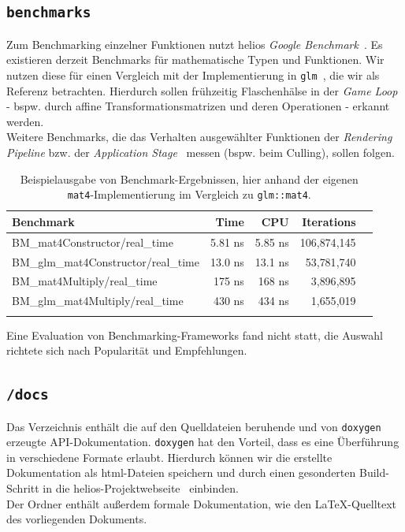 \subsection*{\texttt{benchmarks}}
\noindent
Zum Benchmarking einzelner Funktionen nutzt helios \textit{Google Benchmark}~\cite[]{googlebenchmarkgithub}.
Es existieren derzeit Benchmarks für mathematische Typen und Funktionen.
Wir nutzen diese für einen Vergleich mit der Implementierung in \texttt{glm}~\cite[]{glmGithub}, die wir als Referenz betrachten.
Hierdurch sollen frühzeitig Flaschenhälse in der \textit{Game Loop} - bspw.  durch affine Transformationsmatrizen und deren Operationen - erkannt werden.\\
Weitere Benchmarks, die das Verhalten ausgewählter Funktionen der \textit{Rendering Pipeline} bzw. der \textit{Application Stage}~\cite[687]{Gre19} messen (bspw. beim Culling), sollen folgen.
\begin{table}[h!]
    \centering
    \begin{tabular}{lrrrr}
        \hline
        \textbf{Benchmark} & \textbf{Time} & \textbf{CPU} & \textbf{Iterations} \\
        \hline
        BM\_mat4Constructor/real\_time         & 5.81 ns  & 5.85 ns  & 106{,}874{,}145 \\
        BM\_glm\_mat4Constructor/real\_time    & 13.0 ns  & 13.1 ns  & 53{,}781{,}740 \\
        BM\_mat4Multiply/real\_time            & 175 ns   & 168 ns   & 3{,}896{,}895 \\
        BM\_glm\_mat4Multiply/real\_time       & 430 ns   & 434 ns   & 1{,}655{,}019 \\
        \hline\\
    \end{tabular}
    \label{tab:mat4-benchmark}
    \caption{Beispielausgabe von Benchmark-Ergebnissen, hier anhand der eigenen \texttt{mat4}-Implementierung im Vergleich zu \texttt{glm::mat4}.}
\end{table}

\noindent
Eine Evaluation von Benchmarking-Frameworks fand nicht statt, die Auswahl richtete sich nach Popularität und Empfehlungen.

\subsection*{\texttt{/docs}}
\noindent
Das Verzeichnis enthält die auf den Quelldateien beruhende und von \texttt{doxygen}~\cite[]{Doxygen} erzeugte API-Dokumentation.
\texttt{doxygen} hat den Vorteil, dass es eine Überführung in verschiedene Formate erlaubt. Hierdurch können wir die erstellte Dokumentation als html-Dateien speichern und durch einen gesonderten Build-Schritt in die helios-Projektwebseite~\cite[]{helios} einbinden.\\
Der Ordner enthält außerdem formale Dokumentation, wie den \LaTeX-Quelltext des vorliegenden Dokuments.

